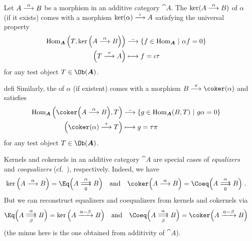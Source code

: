 \documentclass[a4paper,parskip=half,numbers=enddot, DIV=12]{scrreprt}
\begin{document}
\begin{defi}
	Let $A\morphism[\alpha]B$ be a morphism in an additive category ${\cat A}$. The  $\ker(A\morphism[\alpha]B)$ of $\alpha$ (if it exists) comes with a morphism $\ker(\alpha)\morphism[\iota]A$ satisfying the universal property
	\begin{align*}
	\Hom_{\cat A}\left(T,\ker\Big(A\morphism[\alpha]B\Big)\right)&\isomorphism \left\{f\in \Hom_{\cat A}\st \alpha f=0\right\}\\
	\left(T\morphism[\tau]A\right)&\longmapsto f=\iota\tau
	\end{align*}
	for any test object $T\in\Ob({\cat A})$. 
\end{defi}
\begin{varthm}{defi}
	Similarly, the  of $\alpha$ (if existent) comes with a morphism $B\morphism[\pi]\coker(\alpha)$ and satisfies
	\begin{align*}
	\Hom_{\cat A}\left(\coker\Big(A\morphism[\alpha]B\Big),T\right)&\isomorphism \left\{g\in\Hom_{\cat A}(B,T)\st g\alpha=0\right\}\\
	\left(\coker(\alpha)\morphism[\tau]T\right)&\longmapsto g=\tau\pi
	\end{align*}
	for any test object $T\in\Ob({\cat A})$.
\end{varthm}
	
	
\begin{rem}
	Kernels and cokernels in an additive category ${\cat A}$ are special cases of \emph{equalizers} and \emph{coequalizers} (cf.\ \cite[Definition~A.3.2 and Definition~A.3.4]{alggeo1}), respectively. Indeed, we have
	\begin{align*}
		\ker\Big(A\morphism[\alpha]B\Big)=\Eq\Big(A\doublemorphism[\alpha][0]B\Big)\quad\text{and}\quad\coker\Big(A\morphism[\alpha]B\Big)=\Coeq\Big(A\doublemorphism[\alpha][0]B\Big)\;. 
	\end{align*}
	But we can reconstruct equalizers and coequalizers from kernels and cokernels via
	\begin{align*}
		\Eq\Big(A\doublemorphism[\alpha][\beta]B\Big)=\ker\Big(A\xrightarrow{\alpha-\beta}B\Big)\quad\text{and}\quad \Coeq\Big(A\doublemorphism[\alpha][\beta]B\Big)=\coker\Big(A\xrightarrow{\alpha-\beta}B\Big)
	\end{align*}
	(the minus here is the one obtained from additivity of ${\cat A}$). 
\end{rem}
	
\end{document}
